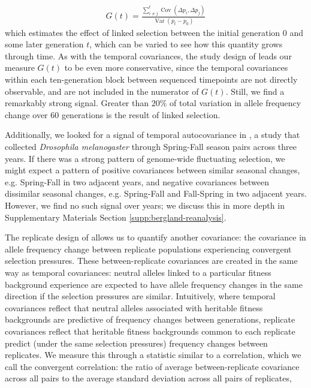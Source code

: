 \documentclass[11pt]{article}
\DeclareMathOperator{\var}{Var}
\DeclareMathOperator{\cov}{Cov}
\begin{document}
\begin{align}
  G(t) = \frac{\sum_{i\ne j}^t \cov(\Delta p_i, \Delta p_j)}{\var(p_t - p_0)}
\end{align}
%
which estimates the effect of linked selection between the initial
generation $0$ and some later generation $t$, which can be varied to see how
this quantity grows through time. As with the temporal covariances, the study
design of \textcite{Barghi2019-qy} leads our measure $G(t)$ to be even more
conservative, since the temporal covariances within each ten-generation block
between sequenced timepoints are not directly observable, and are not included
in the numerator of $G(t)$. Still, we find a remarkably strong signal.
Greater than $20\%$ of total variation in allele frequency change over 60
generations is the result of linked selection.

Additionally, we looked for a signal of temporal autocovariance in
\textcite{Bergland2014-ij}, a study that collected \emph{Drosophila
melanogaster} through Spring-Fall season pairs across three years. If there was
a strong  pattern of genome-wide fluctuating selection, we might expect a
pattern of positive covariances between similar seasonal changes, e.g.
Spring-Fall in two adjacent years, and negative covariances between dissimilar
seasonal changes, e.g. Spring-Fall and Fall-Spring in two adjacent years.
However, we find no such signal over years; we discuss this in more depth in
Supplementary Materials Section \ref{supp:bergland-reanalysis}.

The replicate design of \textcite{Barghi2019-qy} allows us to quantify another
covariance: the covariance in allele frequency change between replicate
populations experiencing convergent selection pressures. These
between-replicate covariances are created in the same way as temporal
covariances: neutral alleles linked to a particular fitness background
experience are expected to have allele frequency changes in the same direction
if the selection pressures are similar. Intuitively, where temporal covariances
reflect that neutral alleles associated with heritable fitness backgrounds are
predictive of frequency changes between generations, replicate covariances
reflect that heritable fitness backgrounds common to each replicate predict
(under the same selection pressures) frequency changes between replicates. We
measure this through a statistic similar to a correlation, which we call the
convergent correlation: the ratio of average between-replicate covariance
across all pairs to the average standard deviation across all pairs of
replicates, 
\end{document}
